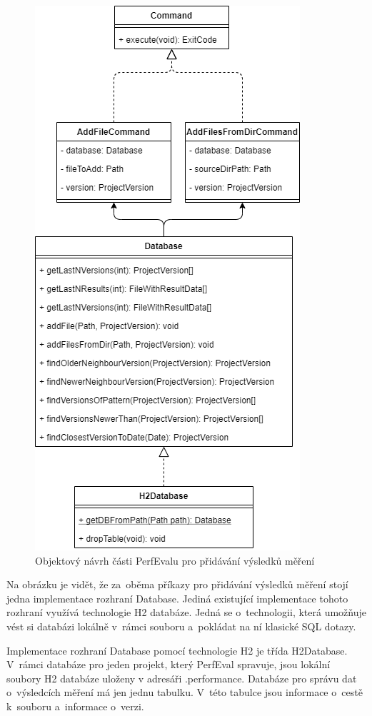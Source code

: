 \begin{figure}[!ht]
    \centering
    \includegraphics[height=0.5\textheight]{../img/perfeval_h2db.png}
    \caption{Objektový návrh části PerfEvalu pro přidávání výsledků měření}
\end{figure}

Na obrázku je vidět, že za~oběma příkazy pro přidávání výsledků měření stojí jedna implementace rozhraní Database.
Jediná existující implementace tohoto rozhraní využívá technologie H2 databáze. Jedná se o~technologii, která umožňuje
vést si databázi lokálně v~rámci souboru a~pokládat na ní klasické SQL dotazy.

Implementace rozhraní Database pomocí technologie H2 je třída H2Database. V~rámci databáze pro jeden projekt, který
PerfEval spravuje, jsou lokální soubory H2 databáze uloženy v adresáři .performance. Databáze pro správu dat o~výsledcích
měření má jen jednu tabulku. V~této tabulce jsou informace o~cestě k~souboru a~informace o~verzi.

